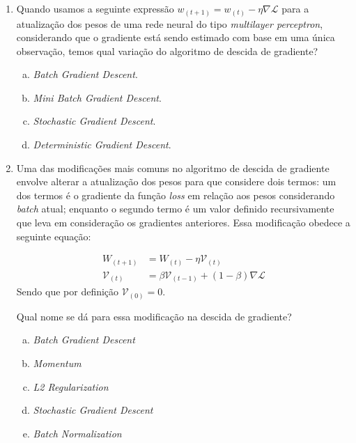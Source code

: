 \documentclass{dlproblemset}
\begin{document}
\begin{enumerate}[1)]
\subsection*{Descida de Gradiente}

    \item Quando usamos a seguinte expressão $w_{(t+1)} = w_{(t)} - \eta \nabla \mathcal{L}$ para a atualização dos pesos de uma rede neural do tipo \textit{multilayer perceptron}, considerando que o gradiente está sendo estimado com base em uma única observação, temos qual variação do algoritmo de descida de gradiente?
    \begin{enumerate}[(a)]
	    \item \textit{Batch Gradient Descent}.
	    \item \textit{Mini Batch Gradient Descent}.
	    \item \textit{Stochastic Gradient Descent}.
	    \item \textit{Deterministic Gradient Descent}.
    \end{enumerate}

    \item Uma das modificações mais comuns no algoritmo de descida de gradiente envolve alterar a atualização dos pesos para que considere dois termos: um dos termos é o gradiente da função \textit{loss} em relação aos pesos considerando \textit{batch} atual; enquanto o segundo termo é um valor definido recursivamente que leva em consideração os gradientes anteriores. Essa modificação obedece a seguinte equação:

    \begin{align*}
        W_{(t+1)} &= W_{(t)} - \eta \mathcal{V}_{(t)} \\
        \mathcal{V}_{(t)} &= \beta \mathcal{V}_{(t-1)} + (1-\beta)\nabla \mathcal{L}
    \end{align*}
    \noindent Sendo que por definição $\mathcal{V}_{(0)} = 0$.

    Qual nome se dá para essa modificação na descida de gradiente?
    \begin{enumerate}[(a)]
        \item \textit{Batch Gradient Descent}
        \item \textit{Momentum}
        \item \textit{L2 Regularization}
        \item \textit{Stochastic Gradient Descent}
        \item \textit{Batch Normalization}
    \end{enumerate}


\end{enumerate}
\end{document}
